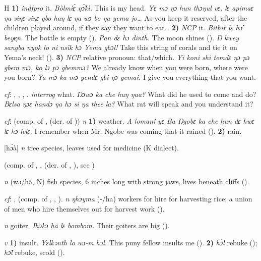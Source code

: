 \begin{letter}{H}
 \textbf{1)} \textit{indfpro} it. \textit{Bòlmìɛ́ ŋɔ̃́kì.} This is my head. \textit{Yɛ mɔ ŋɔ hun thɔŋul vɛ, lɛ apimaɛ ŋa siŋɛ-siŋɛ gbo haŋ lɛ ŋa wɔ bo ŋa yema jo…} As you keep it reserved, after the children played around, if they say they want to eat… \textbf{2)} \textit{NCP} it. \textit{Bithir lɛ hɔ̃ beye̹n.} The bottle is empty (\citealt{Pichl1967}). \textit{Pan dɛ hɔ dinth.} The moon shines (\citealt{Pichl1967}). \textit{Ŋ kwey sangba nyok lo ni nsïk hɔ Yema gbɔl!} Take this string of corals and tie it on Yema's neck! (\citealt{Pichl1967}). \textbf{3)} \textit{NCP} relative pronoun: that/which. \textit{Yi koni shi temdɛ ŋɔ pɔ gbem mɔ, ko lɔ pɔ gbemmɔ?} We already know when you were born, where were you born? \textit{Ya mɔ ka mɔ yendɛ gbi ŋɔ yemai.} I give you everything that you want.

 \textit{cf}: , , , . \textit{interrog} what. \textit{Ŋɔwɔ ka che huŋ ŋaa?} What did he used to come and do? \textit{Bɛlsa ŋɔɛ handɔ ŋa hɔ si ŋa thee la?} What rat will speak and you understand it?

 \textit{cf}:  (comp. of ,  (der. of )) \textit{n} \textbf{1)} weather. \textit{A lomani yɛ Ba Ŋgobɛ ka che hun dɛ hwɛ lɛ hɔ lelɛ.} I remember when Mr. Ngobe was coming that it rained (\citealt{Pichl1967}). \textbf{2)} rain.

 [hɔ̀à] \textit{n} tree species, leaves used for medicine (K dialect). 

 (comp. of , ,  (der. of , ), see ) 

 \textit{n} (wɔ/hã, N) fish species, 6 inches long with strong jaws, lives beneath cliffs (\citealt{Pichl1967}). 

 \textit{cf}: ,  (comp. of , , ). \textit{n} \textit{ŋhɔyma} (-/ha) workers for hire for harvesting rice; a union of men who hire themselves out for harvest work (\citealt{Pichl1967}). 

 \textit{n} goiter. \textit{Ihɔkɔ hã lɛ bombom.} Their goiters are big (\citealt{Pichl1967}). 

 \textit{v} \textbf{1)} insult. \textit{Yɛlkənth lo wɔ-m hɔl.} This puny fellow insults me (\citealt{Pichl1967}). \textbf{2)} \textit{hɔ́l} rebuke (\citealt{Sumner1921}); \textit{hɔ̃l} rebuke, scold (\citealt{Pichl1967}). 


\end{letter}
